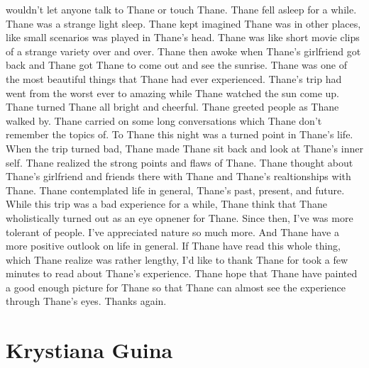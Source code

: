 \documentclass[12pt]{book}
\begin{document}
wouldn't let anyone talk to Thane or touch Thane. Thane fell asleep for a while. Thane was a strange light sleep. Thane kept imagined Thane was in other places, like small scenarios was played in Thane's head. Thane was like short movie clips of a strange variety over and over. Thane then awoke when Thane's girlfriend got back and Thane got Thane to come out and see the sunrise. Thane was one of the most beautiful things that Thane had ever experienced. Thane's trip had went from the worst ever to amazing while Thane watched the sun come up. Thane turned Thane all bright and cheerful. Thane greeted people as Thane walked by. Thane carried on some long conversations which Thane don't remember the topics of. To Thane this night was a turned point in Thane's life. When the trip turned bad, Thane made Thane sit back and look at Thane's inner self. Thane realized the strong points and flaws of Thane. Thane thought about Thane's girlfriend and friends there with Thane and Thane's realtionships with Thane. Thane contemplated life in general, Thane's past, present, and future. While this trip was a bad experience for a while, Thane think that Thane wholistically turned out as an eye opnener for Thane. Since then, I've was more tolerant of people. I've appreciated nature so much more. And Thane have a more positive outlook on life in general. If Thane have read this whole thing, which Thane realize was rather lengthy, I'd like to thank Thane for took a few minutes to read about Thane's experience. Thane hope that Thane have painted a good enough picture for Thane so that Thane can almost see the experience through Thane's eyes. Thanks again.



\chapter{Krystiana Guina}
\end{document}
